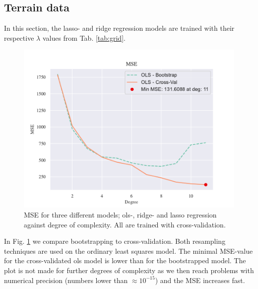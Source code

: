 
\subsection{Terrain data}

In this section, the lasso- and ridge regression models are trained with their respective $\lambda$ values from Tab. \ref{tab:grid}. 

\begin{figure}[h!]
    \centering
    \includegraphics[width=1\linewidth]{project_1_alt/figures/figures_in_report/CV_BS_OLS_Terrain.pdf}
    \caption{MSE for three different models; ols-, ridge- and lasso regression against degree of complexity. All are trained with cross-validation.}
    \label{cv_versus_bs}
\end{figure}

In Fig. \ref{cv_versus_bs} we compare bootstrapping to cross-validation. Both resampling techniques are used on the ordinary least squares model. The minimal MSE-value for the cross-validated ols model is lower than for the bootstrapped model. The plot is not made for further degrees of complexity as we then reach problems with numerical precision (numbers lower than $\approx 10^{-15}$) and the MSE increases fast.  

